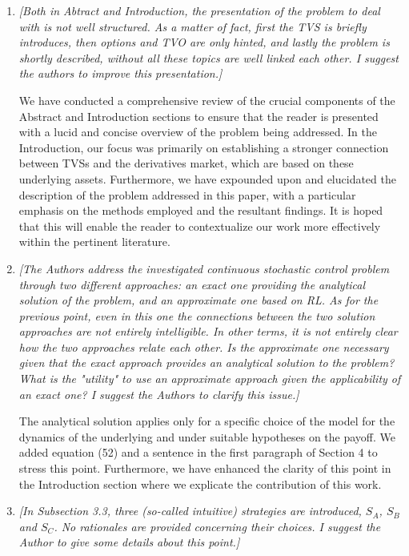 \documentclass{article}
\begin{document}
\begin{enumerate}

 \item \textit{[Both in Abtract and Introduction, the presentation of the problem to deal with is not well structured. As a matter of fact, first the TVS is briefly introduces, then options and TVO are only hinted, and lastly the problem is shortly described, without all these topics are well linked each other. I suggest the authors to improve this presentation.]}

 We have conducted a comprehensive review of the crucial components of the Abstract and Introduction sections to ensure that the reader is presented with a lucid and concise overview of the problem being addressed. In the Introduction, our focus was primarily on establishing a stronger connection between TVSs and the derivatives market, which are based on these underlying assets. Furthermore, we have expounded upon and elucidated the description of the problem addressed in this paper, with a particular emphasis on the methods employed and the resultant findings. It is hoped that this will enable the reader to contextualize our work more effectively within the pertinent literature.

 \item \textit{[The Authors address the investigated continuous stochastic control problem through two different approaches: an exact one providing the analytical solution of the problem, and an approximate one based on RL. As for the previous point, even in this one the connections between the two solution approaches are not entirely intelligible. In other terms, it is not entirely clear how the two approaches relate each other. Is the approximate one necessary given that the exact approach provides an analytical solution to the problem? What is the "utility" to use an approximate approach given the applicability of an exact one? I suggest the Authors to clarify this issue.]} 
 
The analytical solution applies only for a specific choice of the model for the dynamics of the underlying and under suitable hypotheses on the payoff. We added equation (52) and a sentence in the first paragraph of Section 4 to stress this point. Furthermore, we have enhanced the clarity of this point in the Introduction section where we explicate the contribution of this work.

 \item \textit{[In Subsection 3.3, three (so-called intuitive) strategies are introduced, $S_A$, $S_B$ and $S_C$. No rationales are provided concerning their choices. I suggest the Author to give some details about this point.]}


\end{enumerate}
\end{document}
